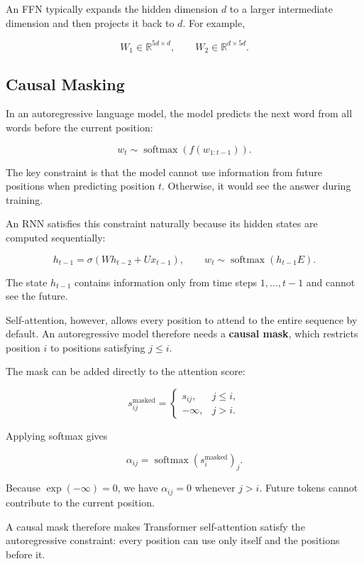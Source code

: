 \documentclass[
  a4paper,
  10pt]{article}
\begin{document}
An FFN typically expands the hidden dimension \(d\) to a larger
intermediate dimension and then projects it back to \(d\). For example,

\[
W_1\in\mathbb{R}^{5d\times d},
\qquad
W_2\in\mathbb{R}^{d\times5d}.
\]

\subsection{Causal Masking}\label{causal-masking}

In an autoregressive language model, the model predicts the next word
from all words before the current position:

\[
w_t\sim\operatorname{softmax}\left(f(w_{1:t-1})\right).
\]

The key constraint is that the model cannot use information from future
positions when predicting position \(t\). Otherwise, it would see the
answer during training.

An RNN satisfies this constraint naturally because its hidden states are
computed sequentially:

\[
h_{t-1}=\sigma\left(Wh_{t-2}+Ux_{t-1}\right),
\qquad
w_t\sim\operatorname{softmax}(h_{t-1}E).
\]

The state \(h_{t-1}\) contains information only from time steps
\(1,\ldots,t-1\) and cannot see the future.

Self-attention, however, allows every position to attend to the entire
sequence by default. An autoregressive model therefore needs a
\textbf{causal mask}, which restricts position \(i\) to positions
satisfying \(j\le i\).

The mask can be added directly to the attention score:

\[
s_{ij}^{\mathrm{masked}}=
\begin{cases}
s_{ij}, & j\le i,\\
-\infty, & j>i.
\end{cases}
\]

Applying softmax gives

\[
\alpha_{ij}
=\operatorname{softmax}\left(s_i^{\mathrm{masked}}\right)_j.
\]

Because \(\exp(-\infty)=0\), we have \(\alpha_{ij}=0\) whenever \(j>i\).
Future tokens cannot contribute to the current position.

A causal mask therefore makes Transformer self-attention satisfy the
autoregressive constraint: every position can use only itself and the
positions before it.
\end{document}
